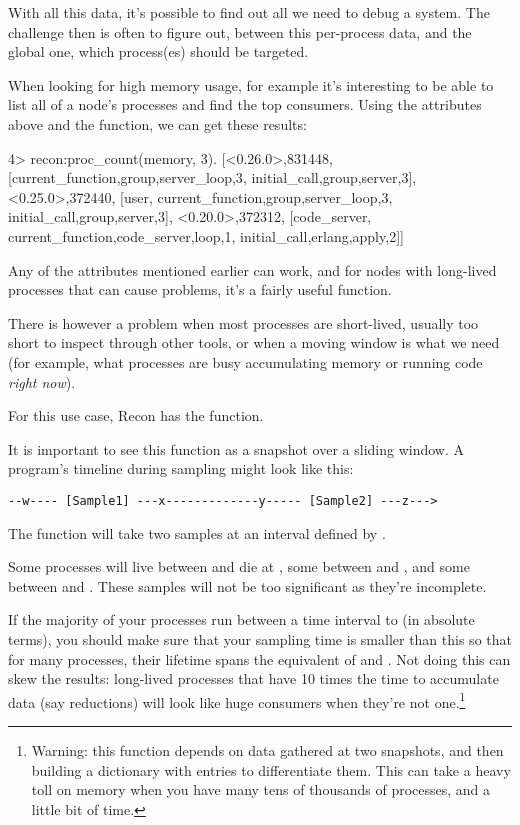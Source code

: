 \documentclass[11pt, oneside]{book}   	%
\begin{document}
With all this data, it's possible to find out all we need to debug a system. The challenge then is often to figure out, between this per-process data, and the global one, which process(es) should be targeted.

When looking for high memory usage, for example it's interesting to be able to list all of a node's processes and find the top  consumers. Using the attributes above and the  function, we can get these results:

\begin{VerbatimEshell}
4> recon:proc_count(memory, 3).
[{<0.26.0>,831448,
  [{current_function,{group,server_loop,3}},
   {initial_call,{group,server,3}}]},
 {<0.25.0>,372440,
  [user,
   {current_function,{group,server_loop,3}},
   {initial_call,{group,server,3}}]},
 {<0.20.0>,372312,
  [code_server,
   {current_function,{code_server,loop,1}},
   {initial_call,{erlang,apply,2}}]}]
\end{VerbatimEshell}

Any of the attributes mentioned earlier can work, and for nodes with long-lived processes that can cause problems, it's a fairly useful function.

There is however a problem when most processes are short-lived, usually too short to inspect through other tools, or when a moving window is what we need (for example, what processes are busy accumulating memory or running code \emph{right now}).

For this use case, Recon has the  function.

It is important to see this function as a snapshot over a sliding window. A program's timeline during sampling might look like this:

\begin{Verbatim}
--w---- [Sample1] ---x-------------y----- [Sample2] ---z--->
\end{Verbatim}

The function will take two samples at an interval defined by .

Some processes will live between  and die at , some between  and , and some between  and . These samples will not be too significant as they're incomplete.

If the majority of your processes run between a time interval  to  (in absolute terms), you should make sure that your sampling time is smaller than this so that for many processes, their lifetime spans the equivalent of  and . Not doing this can skew the results: long-lived processes that have 10 times the time to accumulate data (say reductions) will look like huge consumers when they're not one.\footnote{Warning: this function depends on data gathered at two snapshots, and then building a dictionary with entries to differentiate them. This can take a heavy toll on memory when you have many tens of thousands of processes, and a little bit of time.}
\end{document}
